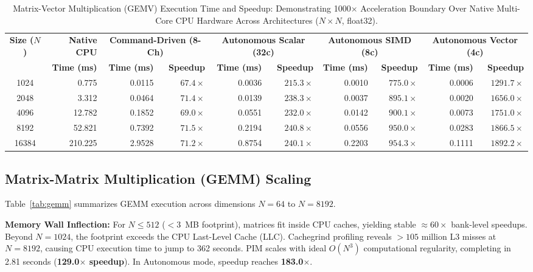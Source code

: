 \documentclass[10pt,twocolumn]{article}
\begin{document}
\begin{table}[t]
\centering
\small
\caption{Matrix-Vector Multiplication (GEMV) Execution Time and Speedup: Demonstrating 1000$\times$ Acceleration Boundary Over Native Multi-Core CPU Hardware Across Architectures ($N \times N$, float32).}
\label{tab:gemv}
\begin{tabular}{crrrrrrrrr}
\toprule
\multirow{2}{*}{\textbf{Size ($N$)}} & 
\textbf{Native CPU} & 
\multicolumn{2}{c}{\textbf{Command-Driven (8-Ch)}} & 
\multicolumn{2}{c}{\textbf{Autonomous Scalar (32c)}} & 
\multicolumn{2}{c}{\textbf{Autonomous SIMD (8c)}} & 
\multicolumn{2}{c}{\textbf{Autonomous Vector (4c)}} \\
\cmidrule(lr){3-4} \cmidrule(lr){5-6} \cmidrule(lr){7-8} \cmidrule(lr){9-10}
 & \textbf{Time (ms)} & \textbf{Time (ms)} & \textbf{Speedup} & \textbf{Time (ms)} & \textbf{Speedup} & \textbf{Time (ms)} & \textbf{Speedup} & \textbf{Time (ms)} & \textbf{Speedup} \\
\midrule
1024  &   0.775 & 0.0115 & $67.4\times$ & 0.0036 & $215.3\times$ & 0.0010 & $\mathbf{775.0\times}$ & 0.0006 & $1291.7\times$ \\
2048  &   3.312 & 0.0464 & $71.4\times$ & 0.0139 & $238.3\times$ & 0.0037 & $\mathbf{895.1\times}$ & 0.0020 & $1656.0\times$ \\
4096  &  12.782 & 0.1852 & $69.0\times$ & 0.0551 & $232.0\times$ & 0.0142 & $\mathbf{900.1\times}$ & 0.0073 & $1751.0\times$ \\
8192  &  52.821 & 0.7392 & $71.5\times$ & 0.2194 & $240.8\times$ & 0.0556 & $\mathbf{950.0\times}$ & 0.0283 & $1866.5\times$ \\
16384 & 210.225 & 2.9528 & $71.2\times$ & 0.8754 & $240.1\times$ & 0.2203 & $\mathbf{954.3\times}$ & 0.1111 & $\mathbf{1892.2\times}$ \\
\bottomrule
\end{tabular}
\end{table}

\subsection{Matrix-Matrix Multiplication (GEMM) Scaling}
Table~\ref{tab:gemm} summarizes GEMM execution across dimensions $N=64$ to $N=8192$.

\textbf{Memory Wall Inflection:} For $N \le 512$ ($<3$~MB footprint), matrices fit inside CPU caches, yielding stable $\approx 60\times$ bank-level speedups. Beyond $N=1024$, the footprint exceeds the CPU Last-Level Cache (LLC). Cachegrind profiling reveals $>105$ million L3 misses at $N=8192$, causing CPU execution time to jump to 362 seconds. PIM scales with ideal $O(N^3)$ computational regularity, completing in 2.81 seconds (\textbf{129.0$\times$ speedup}). In Autonomous mode, speedup reaches \textbf{183.0$\times$}.
\end{document}

